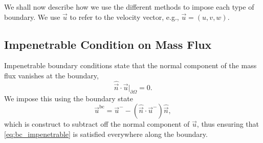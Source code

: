 \documentclass{report}
\numberwithin{equation}{section}
\begin{document}
We shall now describe how we use the different methods to impose each type of boundary. We use $\vec u$ to refer to the velocity vector, e.g., $\vec u = (u, v, w)$.

\subsection{Impenetrable Condition on Mass Flux}

Impenetrable boundary conditions state that the normal component of the mass flux vanishes at the boundary,
\begin{equation}
    \hat{\vec n } \cdot \vec u \big|_{\partial \Omega} = 0.
    \label{eq:bc_impenetrable}
\end{equation}
We impose this using the boundary state 
\begin{equation}
    \vec u^{\text{bc}} = \vec u^- - \left(\hat{\vec n } \cdot \vec u^-\right) \hat{\vec n },
\end{equation}
which is construct to subtract off the normal component of $\vec u$, thus ensuring that \eqref{eq:bc_impenetrable} is satisfied everywhere along the boundary. 
\end{document}

